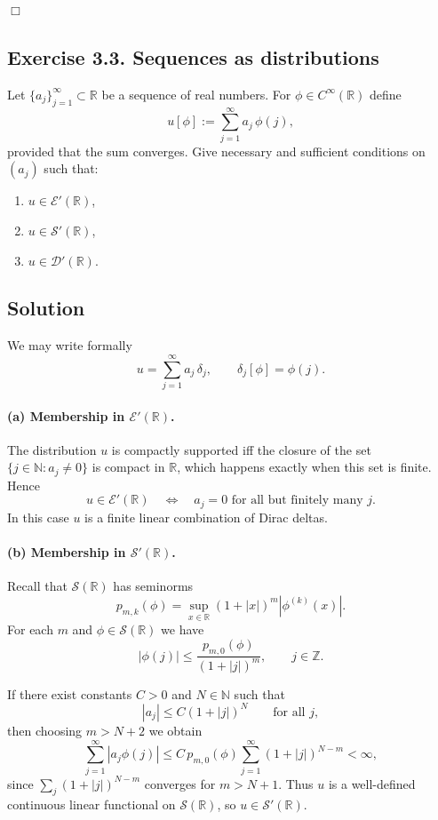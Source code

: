 \documentclass[12pt,a4paper]{article}
\theoremstyle{plain}
\theoremstyle{definition}
\theoremstyle{remark}
\theoremstyle{remark}
\begin{document}
\hfill$\Box$

\subsection*{Exercise 3.3. Sequences as distributions}

Let $\{a_j\}_{j=1}^\infty\subset\mathbb{R}$ be a sequence of real
numbers. For $\phi\in C^\infty(\mathbb{R})$ define
\[
u[\phi] := \sum_{j=1}^\infty a_j\,\phi(j),
\]
provided that the sum converges. Give necessary and sufficient
conditions on $(a_j)$ such that:

\begin{enumerate}
	\item[(a)] $u\in\mathcal{E}'(\mathbb{R})$,
	\item[(b)] $u\in\mathcal{S}'(\mathbb{R})$,
	\item[(c)] $u\in\mathcal{D}'(\mathbb{R})$.
\end{enumerate}

\subsection*{Solution}

We may write formally
\[
u = \sum_{j=1}^\infty a_j\,\delta_j,
\qquad \delta_j[\phi]=\phi(j).
\]

\paragraph{(a) Membership in $\mathcal{E}'(\mathbb{R})$.}
The distribution $u$ is compactly supported iff the closure of the set
$\{j\in\mathbb{N}: a_j\neq 0\}$ is compact in $\mathbb{R}$, which
happens exactly when this set is finite. Hence
\[
u\in\mathcal{E}'(\mathbb{R})
\quad\Longleftrightarrow\quad
a_j=0 \text{ for all but finitely many } j.
\]
In this case $u$ is a finite linear combination of Dirac deltas.

\paragraph{(b) Membership in $\mathcal{S}'(\mathbb{R})$.}
Recall that $\mathcal{S}(\mathbb{R})$ has seminorms
\[
p_{m,k}(\phi) = \sup_{x\in\mathbb{R}} (1+|x|)^m |\phi^{(k)}(x)|.
\]
For each $m$ and $\phi\in\mathcal{S}(\mathbb{R})$ we have
\[
|\phi(j)| \le \frac{p_{m,0}(\phi)}{(1+|j|)^m},\qquad j\in\mathbb{Z}.
\]

If there exist constants $C>0$ and $N\in\mathbb{N}$ such that
\[
|a_j| \le C(1+|j|)^N \qquad\text{for all } j,
\]
then choosing $m>N+2$ we obtain
\[
\sum_{j=1}^\infty |a_j\phi(j)|
\le C\,p_{m,0}(\phi)
\sum_{j=1}^\infty (1+|j|)^{N-m}
< \infty,
\]
since $\sum_j (1+|j|)^{N-m}$ converges for $m>N+1$. Thus $u$ is a
well-defined continuous linear functional on $\mathcal{S}(\mathbb{R})$,
so $u\in\mathcal{S}'(\mathbb{R})$.
\end{document}
